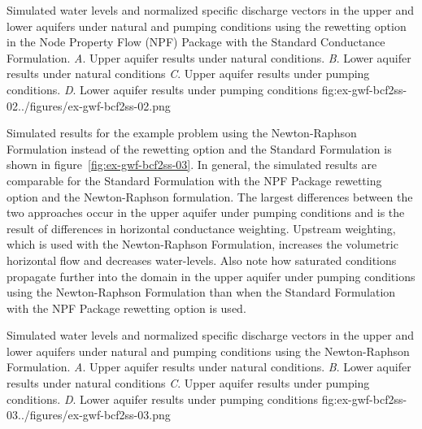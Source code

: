 \begin{StandardFigure}{
                                     Simulated water levels and normalized specific discharge vectors in 
                                     the upper and lower aquifers under natural and pumping conditions
                                     using the rewetting option in the Node Property Flow (NPF) Package
                                     with the Standard Conductance Formulation.
                                     \textit{A}. Upper aquifer results under natural conditions.
                                     \textit{B}. Lower aquifer results under natural conditions
                                     \textit{C}. Upper aquifer results under pumping conditions.
                                     \textit{D}. Lower aquifer results under pumping conditions
                                     }{fig:ex-gwf-bcf2ss-02}{../figures/ex-gwf-bcf2ss-02.png}
\end{StandardFigure} 

Simulated results for the example problem using the Newton-Raphson Formulation instead of the rewetting option and the Standard Formulation is shown in figure~\ref{fig:ex-gwf-bcf2ss-03}. In general, the simulated results are comparable for the Standard Formulation with the NPF Package rewetting option and the Newton-Raphson formulation. The largest differences between the two approaches occur in the upper aquifer under pumping conditions and is the result of differences in horizontal conductance weighting. Upstream weighting, which is used with the Newton-Raphson Formulation, increases the volumetric horizontal flow and decreases water-levels. Also note how saturated conditions propagate further into the domain in the upper aquifer under pumping conditions using the Newton-Raphson Formulation than when the Standard Formulation with the NPF Package rewetting option is used.               

\begin{StandardFigure}{
                                     Simulated water levels and normalized specific discharge vectors in 
                                     the upper and lower aquifers under natural and pumping conditions
                                     using the Newton-Raphson Formulation.
                                     \textit{A}. Upper aquifer results under natural conditions.
                                     \textit{B}. Lower aquifer results under natural conditions
                                     \textit{C}. Upper aquifer results under pumping conditions.
                                     \textit{D}. Lower aquifer results under pumping conditions
                                     }{fig:ex-gwf-bcf2ss-03}{../figures/ex-gwf-bcf2ss-03.png}
\end{StandardFigure}                                 


